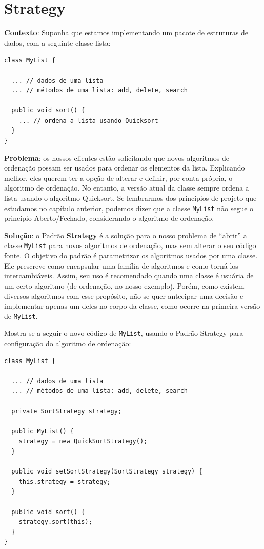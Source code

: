 \documentclass[
  11pt,
  twoside]{book}
\newcommand{\passthrough}[1]{#1}
\begin{document}
\hypertarget{strategy}{%
\section{Strategy}\label{strategy}}

 

\textbf{Contexto}: Suponha que estamos implementando um pacote de
estruturas de dados, com a seguinte classe lista:

\begin{lstlisting}
class MyList {

  ... // dados de uma lista
  ... // métodos de uma lista: add, delete, search

  public void sort() {
    ... // ordena a lista usando Quicksort
  }
}
\end{lstlisting}

\textbf{Problema}: os nossos clientes estão solicitando que novos
algoritmos de ordenação possam ser usados para ordenar os elementos da
lista. Explicando melhor, eles querem ter a opção de alterar e definir,
por conta própria, o algoritmo de ordenação. No entanto, a versão atual
da classe sempre ordena a lista usando o algoritmo Quicksort. Se
lembrarmos dos princípios de projeto que estudamos no capítulo anterior,
podemos dizer que a classe \passthrough{\lstinline!MyList!} não segue o
princípio Aberto/Fechado, considerando o algoritmo de ordenação.

\textbf{Solução}: o Padrão \textbf{Strategy} é a solução para o nosso
problema de ``abrir'' a classe \passthrough{\lstinline!MyList!} para
novos algoritmos de ordenação, mas sem alterar o seu código fonte. O
objetivo do padrão é parametrizar os algoritmos usados por uma classe.
Ele prescreve como encapsular uma família de algoritmos e como torná-los
intercambiáveis. Assim, seu uso é recomendado quando uma classe é
usuária de um certo algoritmo (de ordenação, no nosso exemplo). Porém,
como existem diversos algoritmos com esse propósito, não se quer
antecipar uma decisão e implementar apenas um deles no corpo da classe,
como ocorre na primeira versão de \passthrough{\lstinline!MyList!}.

Mostra-se a seguir o novo código de \passthrough{\lstinline!MyList!},
usando o Padrão Strategy para configuração do algoritmo de ordenação:

\begin{lstlisting}
class MyList {

  ... // dados de uma lista
  ... // métodos de uma lista: add, delete, search

  private SortStrategy strategy;

  public MyList() {
    strategy = new QuickSortStrategy();
  }

  public void setSortStrategy(SortStrategy strategy) {
    this.strategy = strategy;
  }

  public void sort() {
    strategy.sort(this);
  }
}
\end{lstlisting}
\end{document}
